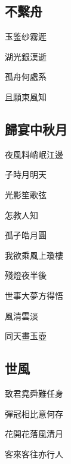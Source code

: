 \documentclass[a4j,12pt]{ltjtarticle}
\begin{document}
\begin{center}
		
	\newpage
	
		\begin{flushleft}
			\section{不繫舟} 
		\end{flushleft}
		
		\vfill
		\LARGE 	玉鉴纱霧遲\par
		湖光銀漢逝 \par
		孤舟何處系 \par
		且願東風知 \par
		\vspace{1.5cm} %
		\vfill
	
	\newpage
	
	\begin{flushleft}
		\section{歸宴中秋月} 
	\end{flushleft}
	
	\vfill
		\LARGE 	夜風料峭岷江邊\par
		子時月明天\par
		光影笙歌弦\par 怎教人知\par
		孤孑皓月圓\par
		我欲乘風上瓊樓\par
		殘燈夜半後\par
		世事大夢方得悟\par 風清雲淡\par
		同天畫玉壺\par
		\vspace{1.5cm} %
	\vfill
		
	
	\newpage
	
	\begin{flushleft}
		\section{世風} 
	\end{flushleft}
	
	\vfill
	\LARGE 	致君堯舜難任身\par
	彈冠相比意何存 \par
	花開花落風清月 \par
	客來客往亦行人 \par
	\vspace{1.5cm} %
	\vfill
	

\end{center}
\end{document}
